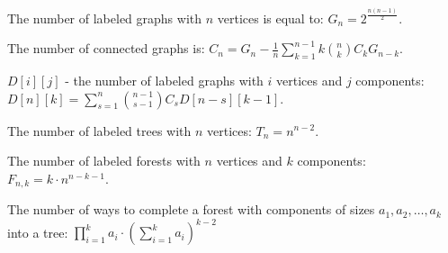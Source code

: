The number of labeled graphs with $n$ vertices is equal to: $G_n = 2^{\frac{n(n-1)}{2}}$.

The number of connected graphs is: $C_n = G_n - \frac{1}{n} \sum \limits_{k=1}^{n-1} k \binom{n}{k} C_k G_{n-k}$.

$D[i][j]$ - the number of labeled graphs with $i$ vertices and $j$ components: $D[n][k] = \sum \limits_{s=1}^{n} \binom{n-1}{s-1} C_s D[n-s][k-1]$.

The number of labeled trees with $n$ vertices: $T_n = n^{n-2}$.

The number of labeled forests with $n$ vertices and $k$ components: $F_{n,k} = k \cdot n^{n-k-1}$.

The number of ways to complete a forest with components of sizes $a_1, a_2, \dots, a_k$ into a tree: $\prod \limits_{i=1}^k a_i \cdot \left(\sum \limits_{i=1}^k a_i \right)^{k-2}$
